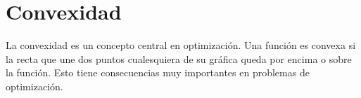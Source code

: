 \documentclass[12pt]{article}
\begin{document}

\section{Convexidad}

La convexidad es un concepto central en optimización. Una función es convexa si la recta que une dos puntos cualesquiera de su gráfica queda por encima o sobre la función. Esto tiene consecuencias muy importantes en problemas de optimización.
\end{document}
